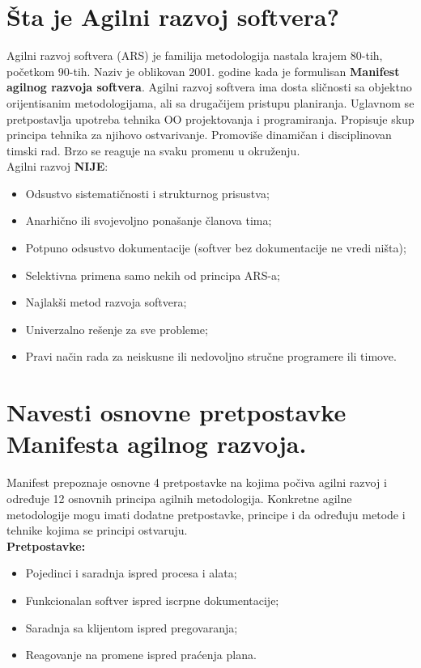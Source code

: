 \documentclass[a4paper]{article}
\begin{document}
\section{Šta je Agilni razvoj softvera?}
  Agilni razvoj softvera (ARS) je familija metodologija nastala krajem 80-tih, početkom 90-tih.
  Naziv je oblikovan 2001. godine kada je formulisan \textbf{Manifest agilnog razvoja softvera}. 
  Agilni  razvoj softvera ima dosta sličnosti sa objektno orijentisanim metodologijama, ali sa
  drugačijem pristupu planiranja. Uglavnom se pretpostavlja upotreba tehnika OO projektovanja i
  programiranja. Propisuje skup principa tehnika za njihovo ostvarivanje. Promoviše dinamičan 
  i disciplinovan timski rad. Brzo se reaguje na svaku promenu u okruženju.
  \cite{agilemanifesto}\cite{ss_agile_manifesto}\\
  Agilni razvoj \textbf{NIJE}:
  \begin{itemize}
    \item Odsustvo sistematičnosti i strukturnog prisustva;
    \item Anarhično ili svojevoljno ponašanje članova tima;
    \item Potpuno odsustvo dokumentacije (softver bez dokumentacije ne vredi ništa);
    \item Selektivna primena samo nekih od principa ARS-a;
    \item Najlakši metod razvoja softvera;
    \item Univerzalno rešenje za sve probleme;
    \item Pravi način rada za neiskusne ili nedovoljno stručne programere ili timove.
  \end{itemize}

\section{Navesti osnovne pretpostavke Manifesta agilnog razvoja.}
  Manifest prepoznaje osnovne 4 pretpostavke na kojima počiva agilni razvoj i određuje 12 osnovnih
  principa agilnih metodologija. Konkretne agilne metodologije mogu imati dodatne pretpostavke, 
  principe i da određuju metode i tehnike kojima se principi ostvaruju. \\
  \textbf{Pretpostavke:}
  \begin{itemize}
    \item Pojedinci i saradnja ispred procesa i alata;
    \item Funkcionalan softver ispred iscrpne dokumentacije;
    \item Saradnja sa klijentom ispred pregovaranja;
    \item Reagovanje na promene ispred praćenja plana.
  \end{itemize}
\end{document}
